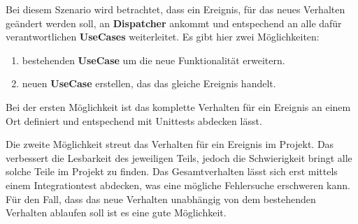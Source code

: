 
    Bei diesem Szenario wird betrachtet, dass ein Ereignis, für das neues Verhalten geändert werden soll, an \textbf{Dispatcher} ankommt und entspechend an alle dafür 
    verantwortlichen \textbf{UseCases} weiterleitet. 
    Es gibt hier zwei Möglichkeiten:
    \begin{enumerate}
        \item bestehenden \textbf{UseCase} um die neue Funktionalität erweitern.
        \item neuen \textbf{UseCase}  erstellen, das das gleiche Ereignis handelt.
    \end{enumerate}

    Bei der ersten Möglichkeit ist das komplette Verhalten für ein Ereignis an einem Ort definiert und entspechend mit Unittests abdecken lässt.

    Die zweite Möglichkeit streut das Verhalten für ein Ereignis im Projekt. Das verbessert die Lesbarkeit des jeweiligen Teils,
    jedoch die Schwierigkeit bringt alle solche Teile im Projekt zu finden. Das Gesamtverhalten lässt sich erst mittels
    einem Integrationtest abdecken, was eine mögliche Fehlersuche erschweren kann. 
    Für den Fall, dass das neue Verhalten unabhängig von dem bestehenden Verhalten ablaufen soll ist es eine gute Möglichkeit.